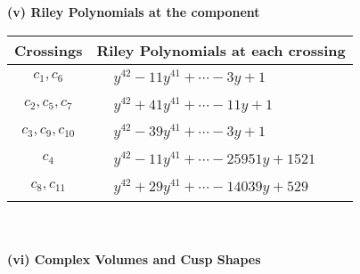 \documentclass[1p]{elsarticle_modified}
\theoremstyle{definition}
\begin{document}
\newpage\renewcommand{\arraystretch}{1}
\flushleft \textbf{(v) Riley Polynomials at the component}\newline \\
\begin{tabular}{m{50pt}|m{274pt}}
Crossings & \hspace{64pt}Riley Polynomials at each crossing \\
\hline $$\begin{aligned}c_{1},c_{6}\end{aligned}$$&$\begin{aligned}
&y^{42}-11 y^{41}+\cdots-3 y+1
\end{aligned}$\\
\hline $$\begin{aligned}c_{2},c_{5},c_{7}\end{aligned}$$&$\begin{aligned}
&y^{42}+41 y^{41}+\cdots-11 y+1
\end{aligned}$\\
\hline $$\begin{aligned}c_{3},c_{9},c_{10}\end{aligned}$$&$\begin{aligned}
&y^{42}-39 y^{41}+\cdots-3 y+1
\end{aligned}$\\
\hline $$\begin{aligned}c_{4}\end{aligned}$$&$\begin{aligned}
&y^{42}-11 y^{41}+\cdots-25951 y+1521
\end{aligned}$\\
\hline $$\begin{aligned}c_{8},c_{11}\end{aligned}$$&$\begin{aligned}
&y^{42}+29 y^{41}+\cdots-14039 y+529
\end{aligned}$\\
\hline
\end{tabular}\\~\\
\newpage\flushleft \textbf{(vi) Complex Volumes and Cusp Shapes}
\end{document}
